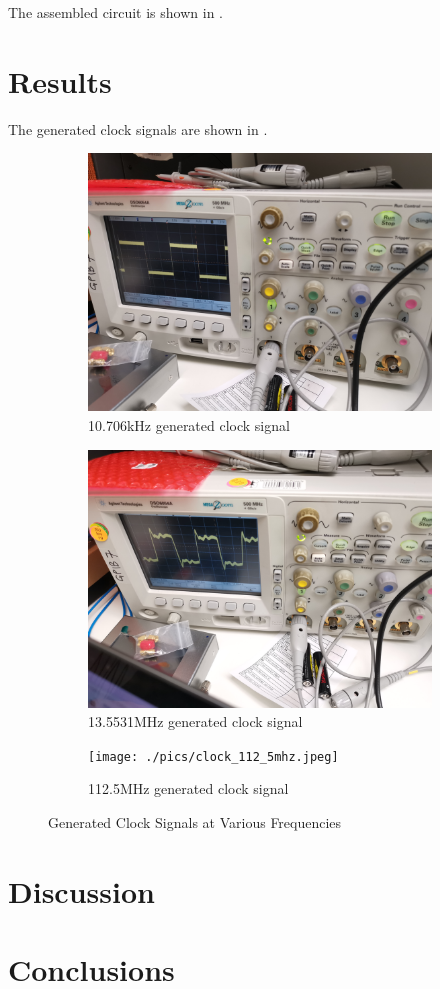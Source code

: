 \documentclass{article}
\begin{document}
The assembled circuit is shown in .

\section{Results}

The generated clock signals are shown in .

\begin{figure}[h]
    \centering
    \begin{subfigure}{.33\linewidth}
        \includegraphics[width=.9\linewidth]{./pics/clock_10_70khz.jpg}
        \caption{10.706kHz generated clock signal}
        \label{fig:clock_10_70k}
    \end{subfigure}%
    \begin{subfigure}{.33\linewidth}
        \includegraphics[width=.9\linewidth]{./pics/clock_13_55mhz.jpg}
        \caption{13.5531MHz generated clock signal}
        \label{fig:clock_13_55m}
    \end{subfigure}%
    \begin{subfigure}{.33\linewidth}
        \texttt{[image: ./pics/clock\_112\_5mhz.jpeg]}
        \caption{112.5MHz generated clock signal}
        \label{fig:clock_112_5m}
    \end{subfigure}%
    \caption{Generated Clock Signals at Various Frequencies}
    \label{fig:clock}
\end{figure}

\section{Discussion}

\section{Conclusions}
\end{document}
